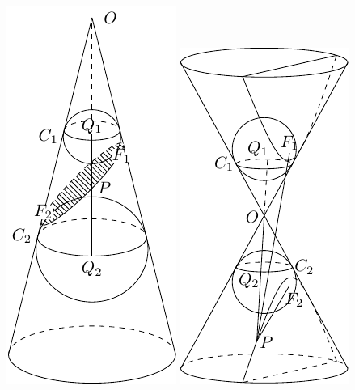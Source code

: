\begin{figure}[htp]\centering
    \begin{minipage}[t]{0.48\textwidth}
    \centering
    \includegraphics{2-conic-section-ellipse.pdf}
    \caption{}
    \end{minipage}
    \begin{minipage}[t]{0.48\textwidth}
    \centering
    \includegraphics{2-conic-section-hyperbola.pdf}
    \caption{}
    \end{minipage}
    \end{figure}


